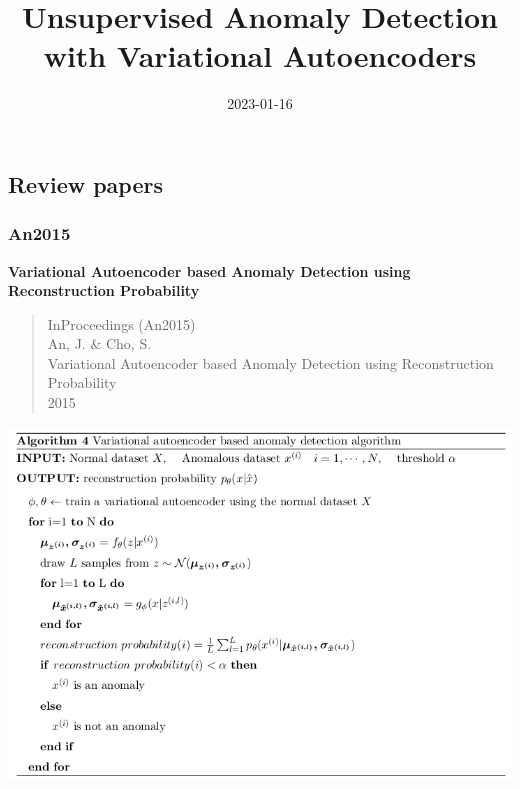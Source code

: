 \documentclass[
  letterpaper,
  DIV=11,
  numbers=noendperiod]{scrartcl}
\title{Unsupervised Anomaly Detection with Variational Autoencoders}
\author{}
\date{2023-01-16}
\renewcommand*\contentsname{Table of contents}
\newcommand\contentsname{Table of contents}
\begin{document}
\maketitle
\ifdefined\Shaded\renewenvironment{Shaded}{\begin{tcolorbox}[enhanced, interior hidden, boxrule=0pt, sharp corners, breakable, borderline west={3pt}{0pt}{shadecolor}, frame hidden]}{\end{tcolorbox}}\fi

\renewcommand*\contentsname{Table of contents}
{
\hypersetup{linkcolor=}
\setcounter{tocdepth}{3}
\tableofcontents
}
\hypertarget{review-papers}{%
\subsection{Review papers}\label{review-papers}}

\hypertarget{an2015}{%
\subsubsection{An2015}\label{an2015}}

\textbf{Variational Autoencoder based Anomaly Detection using
Reconstruction Probability}

\begin{quote}
InProceedings (An2015)\\
An, J. \& Cho, S.\\
Variational Autoencoder based Anomaly Detection using Reconstruction
Probability\\
2015
\end{quote}

\includegraphics{img/2023-01-16-17-17-52.png}
\end{document}
